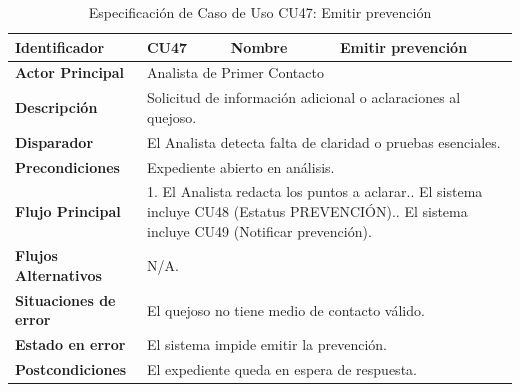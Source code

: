 \begingroup
\setlength{\parskip}{0pt}
\begin{longtable}{|p{3.5cm}|p{2cm}|p{2.5cm}|p{7cm}|}
\caption{Especificación de Caso de Uso CU47: Emitir prevención}
\label{tab:cu47} \\
\hline
\textbf{Identificador} & CU47 & \textbf{Nombre} & Emitir prevención \\ \hline
\textbf{Actor Principal} & \multicolumn{3}{p{11.5cm}|}{Analista de Primer Contacto} \\ \hline
\textbf{Descripción} & \multicolumn{3}{p{11.5cm}|}{Solicitud de información adicional o aclaraciones al quejoso.} \\ \hline
\textbf{Disparador} & \multicolumn{3}{p{11.5cm}|}{El Analista detecta falta de claridad o pruebas esenciales.} \\ \hline
\textbf{Precondiciones} & \multicolumn{3}{p{11.5cm}|}{Expediente abierto en análisis.} \\ \hline
\textbf{Flujo Principal} & \multicolumn{3}{p{11.5cm}|}{1. El Analista redacta los puntos a aclarar.\newline 2. El sistema incluye CU48 (Estatus PREVENCIÓN).\newline 3. El sistema incluye CU49 (Notificar prevención).} \\ \hline
\textbf{Flujos Alternativos} & \multicolumn{3}{p{11.5cm}|}{N/A.} \\ \hline
\textbf{Situaciones de error} & \multicolumn{3}{p{11.5cm}|}{El quejoso no tiene medio de contacto válido.} \\ \hline
\textbf{Estado en error} & \multicolumn{3}{p{11.5cm}|}{El sistema impide emitir la prevención.} \\ \hline
\textbf{Postcondiciones} & \multicolumn{3}{p{11.5cm}|}{El expediente queda en espera de respuesta.} \\ \hline
\end{longtable}
\endgroup

\vspace{0.8cm}


